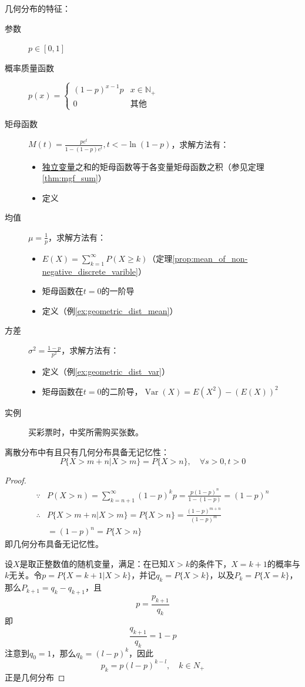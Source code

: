 几何分布的特征：
\begin{description}
    \item[参数] $p \in [0,1]$
    \item[概率质量函数] $p(x)=\begin{cases}
                (1-p)^{x-1} p & x \in \mathbb{N}_+ \\
                0             & \text{其他}
            \end{cases}$
    \item[矩母函数] $M(t)=\frac{p e^t}{1-(1-p)e^t}, t<-\ln (1-p)$，求解方法有：
        \begin{itemize}
            \item \underline{独立变量}之和的矩母函数等于各变量矩母函数之积（参见定理\ref{thm:mgf_sum}）
            \item 定义
        \end{itemize}
    \item[均值] $\mu=\frac{1}{p}$，求解方法有：
        \begin{itemize}
            \item $E(X)=\sum_{k=1}^{\infty}P(X\ge k)$（定理\ref{prop:mean_of_non-negative_discrete_varible}）
            \item 矩母函数在$t=0$的一阶导
            \item 定义（例\ref{ex:geometric_dist_mean}）
        \end{itemize}
    \item[方差] $\sigma^2=\frac{1-p}{p^2}$，求解方法有：
        \begin{itemize}
            \item 定义（例\ref{ex:geometric_dist_var}）
            \item 矩母函数在$t=0$的二阶导，$\operatorname{Var}(X)=E(X^2)-(E(X))^2$
        \end{itemize}
    \item[实例] 买彩票时，中奖所需购买张数。
\end{description}

\begin{proposition}
    离散分布中有且只有几何分布具备无记忆性：
    \[ P\{ X>m+n|X>m \} =P\{ X>n \} ,\quad \forall s>0,t>0\]
\end{proposition}
\begin{proof}
    \begin{align*}
        \because   & P(X>n)=\sum_{k=n+1}^{\infty}(1-p)^k p=\frac{p(1-p)^n}{1-(1-p)}=(1-p)^n \\
        \therefore & P\{ X>m+n|X>m \} =P\{ X>n \}=\frac{(1-p)^{m+n}}{(1-p)^m}               \\
                   & =(1-p)^n=P\{ X>n \}
    \end{align*}
    即几何分布具备无记忆性。

    设$X$是取正整数值的随机变量，满足：在已知$X>k$的条件下，$X=k+1$的概率与$k$无关。令$p=P\{ X=k+1|X>k \}$，并记$q_k=P\{ X>k \}$，以及$P_k=P\{ X=k \}$，那么$P_{k+1}=q_k-q_{k+1}$，且
    \[ p=\frac{p_{k+1}}{q_k} \]
    即
    \[ \frac{q_{k+1}}{q_k}=1-p \]
    注意到$q_0=1$，那么$q_k=(l-p)^k$，因此
    \[ p_k=p(l-p)^{k-l},\quad k \in N_+ \]
    正是几何分布
\end{proof}

